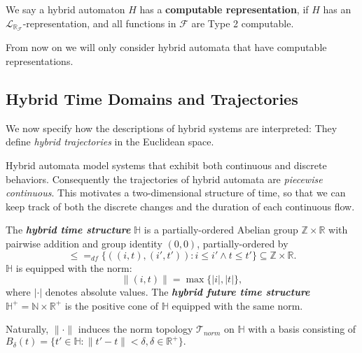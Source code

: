 \documentclass[envcountsect]{llncs}
\newcommand{\lrf}{\mathcal{L}_{\mathbb{R}_{\mathcal{F}}}}
\begin{document}
\begin{definition}
We say a hybrid automaton $H$ has a {\bf computable representation}, if $H$ has an $\lrf$-representation, and all functions in $\mathcal{F}$ are Type 2 computable. 
\end{definition}

From now on we will only consider hybrid automata that have computable representations. 

\subsection{Hybrid Time Domains and Trajectories}

We now specify how the descriptions of hybrid systems are interpreted: They define {\em hybrid trajectories} in the Euclidean space. 

Hybrid automata model systems that exhibit both continuous and discrete behaviors. Consequently the trajectories of hybrid automata are {\em piecewise continuous}. This motivates a two-dimensional structure of time, so that we can keep track of both the discrete changes and the duration of each continuous flow.  

\begin{definition}
The {\bf\em hybrid time structure} $\mathbb{H}$ is a partially-ordered Abelian group $\mathbb{Z}\times\mathbb{R}$ with pairwise addition and group identity $(0,0)$, partially-ordered by $$\leq =_{df} \{ ((i,t),(i',t')) : i\leq i' \wedge t\leq t'\}\subseteq \mathbb{Z}\times\mathbb{R}.$$
 $\mathbb{H}$ is equipped with the norm: $$\|(i,t)\| = \max\{|i|,|t|\},$$
where $|\cdot|$ denotes absolute values. The {\bf\em hybrid future time structure} $\mathbb{H}^+=\mathbb{N}\times \mathbb{R}^+$ is the positive cone of $\mathbb{H}$ equipped with the same norm.
\end{definition}

\begin{remark}
Naturally, $\|\cdot\|$ induces the norm topology $\mathcal{T}_{norm}$ on $\mathbb{H}$ with a basis consisting of $B_{\delta}(t) = \{t'\in \mathbb{H}: \|t'-t\|<\delta, \delta\in \mathbb{R}^+\}.$
\end{remark}
\end{document}
